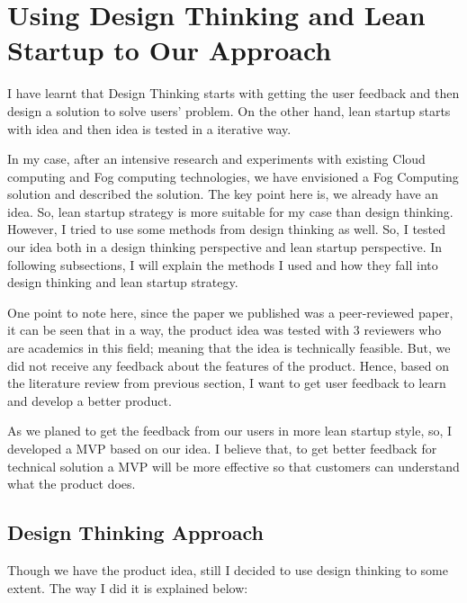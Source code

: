 \section{Using Design Thinking and Lean Startup to Our Approach}

I have learnt that Design Thinking starts with getting the user feedback and then design a solution to solve users' problem. On the other hand, lean startup starts with idea and then idea is tested in a iterative way.

In my case, after an intensive research and experiments with existing Cloud computing and Fog computing technologies, we have envisioned a Fog Computing solution and  described the solution\citep{ProgFogNode}. The key point here is, we already have an idea. So, lean startup strategy is more suitable for my case than design thinking. However, I tried to use some methods from design thinking as well. So, I tested our idea both in a design thinking perspective and lean startup perspective. In following subsections, I will explain the methods I used and how they fall into design thinking and lean startup strategy.

One point to note here, since the paper we published was a peer-reviewed paper, it can be seen that in a way, the product idea was tested with 3 reviewers who are academics in this field; meaning that the idea is technically feasible. But, we did not receive any feedback about the features of the product. Hence, based on the literature review from previous section, I want to get user feedback to learn and develop a better product. %

As we planed to get the feedback from our users in more lean startup style, so, I developed a \ac{MVP} based on our idea. I believe that, to get better feedback for technical solution a \ac{MVP} will be more effective so that customers can understand what the product does. 

\subsection{Design Thinking Approach}
Though we have the product idea, still I decided to use design thinking to some extent. The way I did it is explained below:

